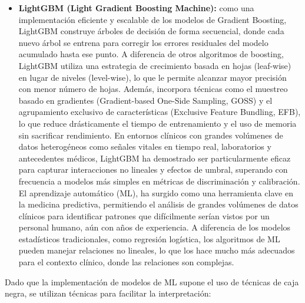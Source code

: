 \documentclass[12pt, letterpaper]{article}
\begin{document}
\begin{itemize}
    \item \textbf{LightGBM (Light Gradient Boosting Machine):} como una implementación eficiente y escalable de los modelos de Gradient Boosting, LightGBM construye árboles de decisión de forma secuencial, donde cada nuevo árbol se entrena para corregir los errores residuales del modelo acumulado hasta ese punto. A diferencia de otros algoritmos de boosting, LightGBM utiliza una estrategia de crecimiento basada en hojas (leaf-wise) en lugar de niveles (level-wise), lo que le permite alcanzar mayor precisión con menor número de hojas. Además, incorpora técnicas como el muestreo basado en gradientes (Gradient-based One-Side Sampling, GOSS) y el agrupamiento exclusivo de características (Exclusive Feature Bundling, EFB), lo que reduce drásticamente el tiempo de entrenamiento y el uso de memoria sin sacrificar rendimiento. En entornos clínicos con grandes volúmenes de datos heterogéneos como señales vitales en tiempo real, laboratorios y antecedentes médicos, LightGBM ha demostrado ser particularmente eficaz para capturar interacciones no lineales y efectos de umbral, superando con frecuencia a modelos más simples en métricas de discriminación y calibración. El aprendizaje automático (ML), ha surgido como una herramienta clave en la medicina predictiva, permitiendo el análisis de grandes volúmenes de datos clínicos para identificar patrones que difícilmente serían vistos por un personal humano, aún con años de experiencia. A diferencia de los modelos estadísticos tradicionales, como regresión logística, los algoritmos de ML pueden manejar relaciones no lineales, lo que los hace mucho más adecuados para el contexto clínico, donde las relaciones son complejas.
\end{itemize}

Dado que la implementación de modelos de ML supone el uso de técnicas de caja negra, se utilizan técnicas para facilitar la interpretación:
\end{document}
